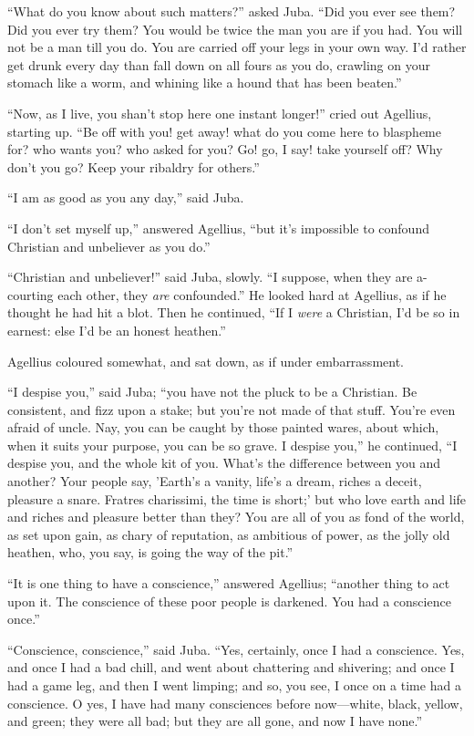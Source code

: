 ``What do you know about such matters?'' asked Juba.
``Did you ever see them? Did you ever try them? You would be twice
the man you are if you had. You will not be a man till you do. You are
carried off your legs in your own way. I'd rather get drunk every day
than fall down on all fours as you do, crawling on your stomach like a
worm, and whining like a hound that has been beaten.''

``Now, as I live, you shan't stop here one instant
longer!'' cried out Agellius, starting up. ``Be off with you!
get away! what do you come here to blaspheme for? who wants you? who
asked for you? Go! go, I say! take yourself off? Why don't you go?
Keep your ribaldry for others.''

``I am as good as you any day,'' said Juba.

``I don't set myself up,'' answered Agellius, ``but it's
impossible to confound Christian and unbeliever as you do.''

``Christian and unbeliever!'' said Juba, slowly. ``I
suppose, when they are a-courting each other, they \emph{are}
confounded.'' He looked hard at Agellius, as if he thought he had
hit a blot. Then he continued, ``If I \emph{were} a Christian, I'd
be so in earnest: else I'd be an honest heathen.''

Agellius coloured somewhat, and sat down, as if under
embarrassment.

``I despise you,'' said Juba; ``you have not the pluck
to be a Christian. Be consistent, and fizz upon a stake; but you're
not made of that stuff. You're even afraid of uncle. Nay, you can be
caught by those painted wares, about which, when it suits your
purpose, you can be so grave. I despise you,'' he continued,
``I despise you, and the whole kit of you. What's the difference
between you and another? Your people say, 'Earth's a vanity, life's
a dream, riches a deceit, pleasure a snare. Fratres charissimi, the
time is short;' but who love earth and life and riches and pleasure
better than they? You are all of you as fond of the world, as set upon
gain, as chary of reputation, as ambitious of power, as the jolly old
heathen, who, you say, is going the way of the pit.''

``It is one thing to have a conscience,'' answered Agellius;
``another thing to act upon it. The conscience of these poor
people is darkened. You had a conscience once.''

``Conscience, conscience,'' said Juba. ``Yes,
certainly, once I had a conscience. Yes, and once I had a bad chill,
and went about chattering and shivering; and once I had a game
leg, and then I went limping; and so, you see, I once on a time had a
conscience. O yes, I have had many consciences before now—white,
black, yellow, and green; they were all bad; but they are all gone,
and now I have none.''


